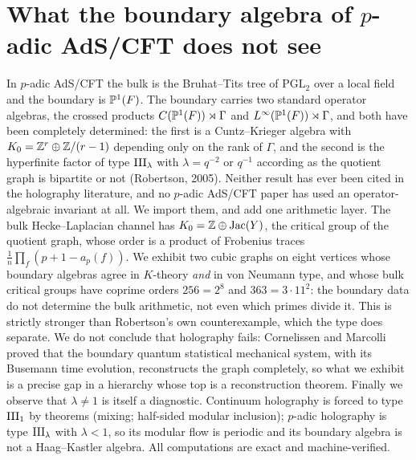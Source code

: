 \chapter[\texorpdfstring{What the boundary algebra of $p$-adic AdS/CFT does not see}{What the boundary algebra of p-adic AdS/CFT does not see}]{\texorpdfstring{What the boundary algebra of $p$-adic AdS/CFT does not see}{What the boundary algebra of p-adic AdS/CFT does not see}}\label{chap:Holo1}
\begin{chapterabstract}
\noindent
In $p$-adic AdS/CFT the bulk is the Bruhat--Tits tree of $\mathrm{PGL}_2$ over a local
field and the boundary is $\mathbb{P}^1(F)$. The boundary carries two standard operator algebras,
the crossed products $C(\mathbb{P}^1(F))\rtimes\Gamma$ and $L^\infty(\mathbb{P}^1(F))\rtimes\Gamma$, and
both have been completely determined: the first is a Cuntz--Krieger algebra with
$K_0=\mathbb{Z}^{r}\oplus\mathbb{Z}/(r-1)$ depending only on the rank of $\Gamma$, and the second is the
hyperfinite factor of type $\mathrm{III}_\lambda$ with $\lambda=q^{-2}$ or $q^{-1}$ according as
the quotient graph is bipartite or not (Robertson, 2005). Neither result has ever been
cited in the holography literature, and no $p$-adic AdS/CFT paper has used an
operator-algebraic invariant at all. We import them, and add one arithmetic layer. The
bulk Hecke--Laplacian channel has $K_0=\mathbb{Z}\oplus\operatorname{Jac}(Y)$, the critical group of the
quotient graph, whose order is a product of Frobenius traces
$\frac1n\prod_f(p+1-a_p(f))$. We exhibit two cubic graphs on eight vertices whose boundary
algebras agree in $K$-theory \emph{and} in von Neumann type, and whose bulk critical groups
have coprime orders $256=2^8$ and $363=3\cdot11^2$: the boundary data do not determine the
bulk arithmetic, not even which primes divide it. This is strictly stronger than
Robertson's own counterexample, which the type does separate. We do not conclude that
holography fails: Cornelissen and Marcolli proved that the boundary quantum statistical
mechanical system, with its Busemann time evolution, reconstructs the graph completely, so
what we exhibit is a precise gap in a hierarchy whose top is a reconstruction theorem.
Finally we observe that $\lambda\ne1$ is itself a diagnostic. Continuum holography is
forced to type $\mathrm{III}_1$ by theorems (mixing; half-sided modular inclusion); $p$-adic
holography is type $\mathrm{III}_\lambda$ with $\lambda<1$, so its modular flow is periodic and its
boundary algebra is not a Haag--Kastler algebra. All computations are exact and
machine-verified.
\end{chapterabstract}

